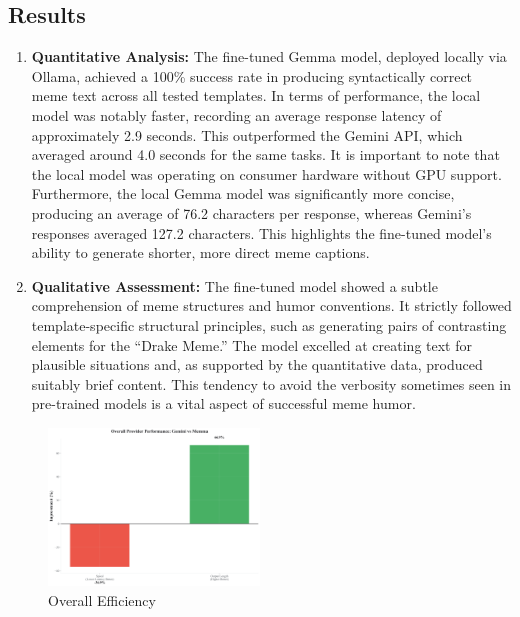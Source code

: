 \documentclass[conference]{IEEEtran}
\begin{document}
\subsection{Results}
\begin{enumerate}
    \item \textbf{Quantitative Analysis:} The fine-tuned Gemma model, deployed locally via Ollama, achieved a 100\% success rate in producing syntactically correct meme text across all tested templates. In terms of performance, the local model was notably faster, recording an average response latency of approximately 2.9 seconds. This outperformed the Gemini API, which averaged around 4.0 seconds for the same tasks. It is important to note that the local model was operating on consumer hardware without GPU support. Furthermore, the local Gemma model was significantly more concise, producing an average of  76.2 characters per response, whereas Gemini's responses averaged 127.2 characters. This highlights the fine-tuned model's ability to generate shorter, more direct meme captions.
    \item \textbf{Qualitative Assessment:} The fine-tuned model showed a subtle comprehension of meme structures and humor conventions. It strictly followed template-specific structural principles, such as generating pairs of contrasting elements for the “Drake Meme.” The model excelled at creating text for plausible situations and, as supported by the quantitative data, produced suitably brief content. This tendency to avoid the verbosity sometimes seen in pre-trained models is a vital aspect of successful meme humor.
\end{enumerate}

\begin{figure}[htbp]
\centering
\includegraphics[width=0.5\textwidth]{Assets/graphs/overall_provider_efficiency.png}
\caption{Overall Efficiency}
\label{fig:overall-efficiency}
\end{figure}
\end{document}
